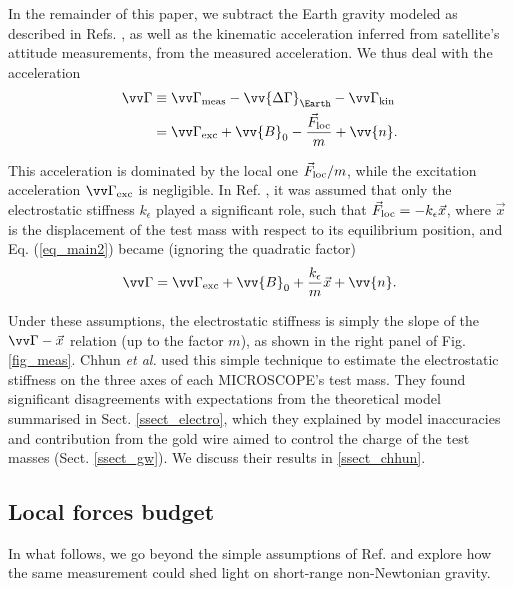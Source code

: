 \documentclass[12pt]{iopart}
\begin{document}
In the remainder of this paper, we subtract the Earth gravity modeled as described in Refs. \cite{touboul19, berge_cqg7}, as well as the kinematic acceleration inferred from satellite's attitude measurements, from the measured acceleration.
We thus deal with the acceleration
\begin{align} \label{eq_main1}
\vv\Gamma & \equiv \vv\Gamma_{\rm meas} - \vv{\Delta\Gamma}_\Earth - \vv\Gamma_{\rm kin} \\
\label{eq_main2}
&= \vv\Gamma_{\rm exc} + \vv{B}_{0} - \frac{\vec{F}_{\rm loc}}{m} + \vv{n}.
\end{align}

This acceleration is dominated by the local one $\vec{F}_{\rm loc}/m$, while the excitation acceleration $\vv\Gamma_{\rm exc}$ is negligible.
In Ref. \cite{chhuncqg5}, it was assumed that only the electrostatic stiffness $k_\epsilon$ played a significant role, such that $\vec{F}_{\rm loc} = -k_\epsilon \vec{x}$, where $\vec{x}$ is the displacement of the test mass with respect to its equilibrium position, and Eq. (\ref{eq_main2}) became (ignoring the quadratic factor)
\begin{equation} 
\vv\Gamma = \vv\Gamma_{\rm exc} + \vv{B}_0 + \frac{k_\epsilon}{m} \vec{x} + \vv{n}.
\end{equation}

Under these assumptions, the electrostatic stiffness is simply the slope of the $\vv\Gamma - \vec{x}$ relation (up to the factor $m$), as shown in the right panel of Fig. \ref{fig_meas}. Chhun {\em et al.} \cite{chhuncqg5} used this simple technique to estimate the electrostatic stiffness on the three axes of each MICROSCOPE's test mass. They found significant disagreements with expectations from the theoretical model summarised in Sect. \ref{ssect_electro}, which they explained by model inaccuracies and contribution from the gold wire aimed to control the charge of the test masses (Sect. \ref{ssect_gw}). We discuss their results in \ref{ssect_chhun}.



\subsection{Local forces budget} \label{ssect_budget}

In what follows, we go beyond the simple assumptions of Ref. \cite{chhuncqg5} and explore how the same measurement could shed light on short-range non-Newtonian gravity.
\end{document}
